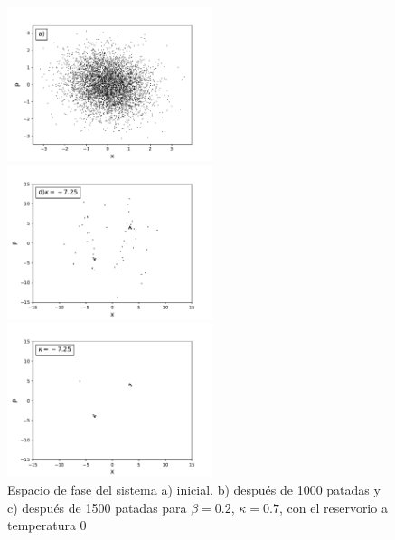 \documentclass[letterpaper,12pt,oneside]{book}
\begin{document}
\begin{figure}[h!]
	\centering
	\begin{minipage}{0.32\textwidth}
		\includegraphics[width=6cm]{Figs/PhaseSpaceInitial}
	\end{minipage}
	\begin{minipage}{0.32\textwidth}
		\includegraphics[width=6cm]{Figs/PhaseSpace725K1000Aft}
	\end{minipage}
	\begin{minipage}{0.32\textwidth}
		\includegraphics[width=6cm]{Figs/Atractoresk725}
	\end{minipage}
	\caption{Espacio de fase del sistema a) inicial, b) después de 1000 patadas y c) después de 1500 patadas para $\beta=0.2$, $\kappa=0.7$, con el reservorio a temperatura 0}
	\label{fig:Atractores2}
	
\end{figure}
\end{document}
